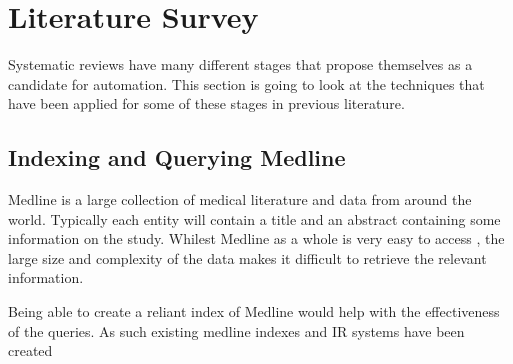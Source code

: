 \chapter{Literature Survey}

Systematic reviews have many different stages that propose themselves as a candidate for automation. This section is going to look at the techniques that have been applied for some of these stages in previous literature.

\section{Indexing and Querying Medline}

Medline is a large collection of medical literature and data from around the world. Typically each entity will contain a title and an abstract containing some information on the study. Whilest Medline as a whole is very easy to access \cite{medline}, the large size and complexity of the data makes it difficult to retrieve the relevant information.

Being able to create a reliant index of Medline would help with the effectiveness of the queries. As such existing medline indexes and IR systems have been created \cite{nlm}
